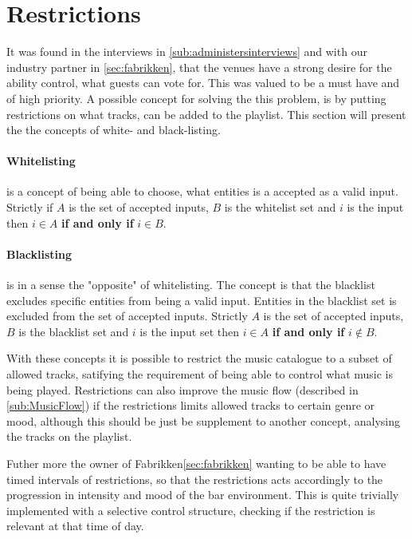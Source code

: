 \section{Restrictions}
\label{sec:restrictions}

It was found in the interviews in \cref{sub:administersinterviews} and with our industry partner in \cref{sec:fabrikken}, that the venues have a strong desire for the ability control, what guests can vote for. This was valued to be a must have and of high priority. A possible concept for solving the this problem, is by putting restrictions on what tracks, can be added to the playlist. This section will present the the concepts of white- and black-listing.

\paragraph{Whitelisting} is a concept of being able to choose, what entities is a accepted as a valid input. Strictly if $A$ is the set of accepted inputs, $B$ is the whitelist set and $i$ is the input then $i \in A$ \textbf{if and only if} $i \in B$.

\paragraph{Blacklisting} is in a sense the "opposite" of whitelisting. The concept is that the blacklist excludes specific entities from being a valid input. Entities in the blacklist set is excluded from the set of accepted inputs. Strictly $A$ is the set of accepted inputs, $B$ is the blacklist set and $i$ is the input set then $i \in A$ \textbf{if and only if} $i \notin B$.

With these concepts it is possible to restrict the music catalogue to a subset of allowed tracks, satifying the requirement of being able to control what music is being played. Restrictions can also improve the music flow (described in \cref{sub:MusicFlow}) if the restrictions limits allowed tracks to certain genre or mood, although this should be just be supplement to another concept, analysing the tracks on the playlist.

Futher more the owner of Fabrikken\cref{sec:fabrikken} wanting to be able to have timed intervals of restrictions, so that the restrictions acts accordingly to the progression in intensity and mood of the bar environment. This is quite trivially implemented with a selective control structure, checking if the restriction is relevant at that time of day.